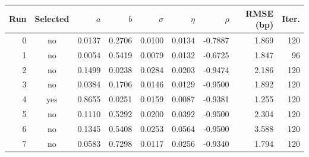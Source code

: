 \begin{tabular}{rcrrrrrrr}
\toprule
Run & Selected & $a$ & $b$ & $\sigma$ & $\eta$ & $\rho$ & RMSE (bp) & Iter. \\
\midrule
0 & no & 0.0137 & 0.2706 & 0.0100 & 0.0134 & -0.7887 & 1.869 & 120 \\
1 & no & 0.0054 & 0.5419 & 0.0079 & 0.0132 & -0.6725 & 1.847 & 96 \\
2 & no & 0.1499 & 0.0238 & 0.0284 & 0.0203 & -0.9474 & 2.186 & 120 \\
3 & no & 0.0384 & 0.1706 & 0.0146 & 0.0129 & -0.9500 & 1.892 & 120 \\
4 & yes & 0.8655 & 0.0251 & 0.0159 & 0.0087 & -0.9381 & 1.255 & 120 \\
5 & no & 0.1110 & 0.5292 & 0.0200 & 0.0392 & -0.9500 & 2.304 & 120 \\
6 & no & 0.1345 & 0.5408 & 0.0253 & 0.0564 & -0.9500 & 3.588 & 120 \\
7 & no & 0.0583 & 0.7298 & 0.0117 & 0.0256 & -0.9340 & 1.794 & 120 \\
\bottomrule
\end{tabular}
